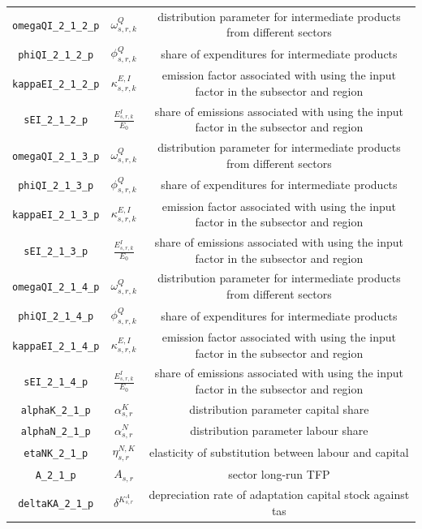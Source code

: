\begin{center}
\begin{longtable}{ccc}
\texttt{omegaQI\_2\_1\_2\_p} & ${\omega^{Q}_{s,r,k}}$ & distribution parameter for intermediate products from different sectors\\
\texttt{phiQI\_2\_1\_2\_p} & ${\phi^{Q}_{s,r,k}}$ & share of expenditures for intermediate products\\
\texttt{kappaEI\_2\_1\_2\_p} & ${\kappa^{E,I}_{s,r,k}}$ & emission factor associated with using the input factor in the subsector and region\\
\texttt{sEI\_2\_1\_2\_p} & ${\frac{E^{I}_{s,r,k}}{E_0}}$ & share of emissions associated with using the input factor in the subsector and region\\
\texttt{omegaQI\_2\_1\_3\_p} & ${\omega^{Q}_{s,r,k}}$ & distribution parameter for intermediate products from different sectors\\
\texttt{phiQI\_2\_1\_3\_p} & ${\phi^{Q}_{s,r,k}}$ & share of expenditures for intermediate products\\
\texttt{kappaEI\_2\_1\_3\_p} & ${\kappa^{E,I}_{s,r,k}}$ & emission factor associated with using the input factor in the subsector and region\\
\texttt{sEI\_2\_1\_3\_p} & ${\frac{E^{I}_{s,r,k}}{E_0}}$ & share of emissions associated with using the input factor in the subsector and region\\
\texttt{omegaQI\_2\_1\_4\_p} & ${\omega^{Q}_{s,r,k}}$ & distribution parameter for intermediate products from different sectors\\
\texttt{phiQI\_2\_1\_4\_p} & ${\phi^{Q}_{s,r,k}}$ & share of expenditures for intermediate products\\
\texttt{kappaEI\_2\_1\_4\_p} & ${\kappa^{E,I}_{s,r,k}}$ & emission factor associated with using the input factor in the subsector and region\\
\texttt{sEI\_2\_1\_4\_p} & ${\frac{E^{I}_{s,r,k}}{E_0}}$ & share of emissions associated with using the input factor in the subsector and region\\
\texttt{alphaK\_2\_1\_p} & ${\alpha^{K}_{s,r}}$ & distribution parameter capital share\\
\texttt{alphaN\_2\_1\_p} & ${\alpha^{N}_{s,r}}$ & distribution parameter labour share\\
\texttt{etaNK\_2\_1\_p} & ${\eta^{N,K}_{s,r}}$ & elasticity of substitution between labour and capital\\
\texttt{A\_2\_1\_p} & ${A_{s,r}}$ & sector long-run TFP\\
\texttt{deltaKA\_2\_1\_p} & ${\delta^{K^{A}_{s,r}}}$ & depreciation rate of adaptation capital stock against tas\\

\end{longtable}
\end{center}

